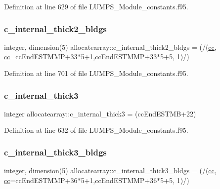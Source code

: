 Definition at line 629 of file L\+U\+M\+P\+S\+\_\+\+Module\+\_\+constants.\+f95.

\mbox{\label{namespaceallocatearray_af11e6ee064aaacc4d28820ad00309f0d}} 
\subsubsection{\texorpdfstring{c\+\_\+internal\+\_\+thick2\+\_\+bldgs}{c\_internal\_thick2\_bldgs}}
{\footnotesize\ttfamily integer, dimension(5) allocatearray\+::c\+\_\+internal\+\_\+thick2\+\_\+bldgs = (/(\hyperlink{namespaceallocatearray_ac863c81704eb507dee10f5e10741e10c}{cc}, \hyperlink{namespaceallocatearray_ac863c81704eb507dee10f5e10741e10c}{cc}=cc\+End\+E\+S\+T\+M\+MP+33$\ast$5+1,cc\+End\+E\+S\+T\+M\+MP+33$\ast$5+5, 1)/)}



Definition at line 701 of file L\+U\+M\+P\+S\+\_\+\+Module\+\_\+constants.\+f95.

\mbox{\label{namespaceallocatearray_a5948fd07dadcd73d96ce4235456b468d}} 
\subsubsection{\texorpdfstring{c\+\_\+internal\+\_\+thick3}{c\_internal\_thick3}}
{\footnotesize\ttfamily integer allocatearray\+::c\+\_\+internal\+\_\+thick3 = (cc\+End\+E\+S\+T\+MB+22)}



Definition at line 632 of file L\+U\+M\+P\+S\+\_\+\+Module\+\_\+constants.\+f95.

\mbox{\label{namespaceallocatearray_a1d2cef0d909c186f48abcaac79286f29}} 
\subsubsection{\texorpdfstring{c\+\_\+internal\+\_\+thick3\+\_\+bldgs}{c\_internal\_thick3\_bldgs}}
{\footnotesize\ttfamily integer, dimension(5) allocatearray\+::c\+\_\+internal\+\_\+thick3\+\_\+bldgs = (/(\hyperlink{namespaceallocatearray_ac863c81704eb507dee10f5e10741e10c}{cc}, \hyperlink{namespaceallocatearray_ac863c81704eb507dee10f5e10741e10c}{cc}=cc\+End\+E\+S\+T\+M\+MP+36$\ast$5+1,cc\+End\+E\+S\+T\+M\+MP+36$\ast$5+5, 1)/)}



